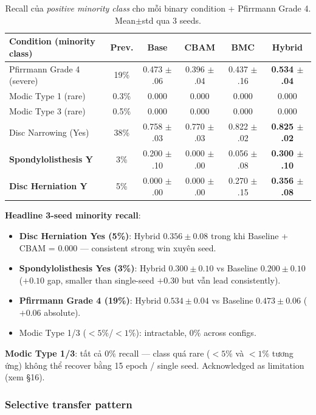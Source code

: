 \documentclass[11pt,a4paper]{article}
\newcommand{\best}[1]{\textcolor{best}{\textbf{#1}}}
\begin{document}
\begin{table}[h]
\centering
\caption{Recall của \emph{positive minority class} cho mỗi binary
condition + Pfirrmann Grade 4. Mean$\pm$std qua 3 seeds.}
\label{tab:spider_minority_recall}
\small
\begin{tabular}{@{}lccccc@{}}
\toprule
\rowcolor{tablehdr}
Condition (minority class) & Prev. & Base & CBAM & BMC & Hybrid \\
\midrule
Pfirrmann Grade 4 (severe)   & 19\%  & 0.473 $\pm$ .06 & 0.396 $\pm$ .04 & 0.437 $\pm$ .16 & \best{0.534 $\pm$ .04} \\
Modic Type 1 (rare)          & 0.3\% & 0.000 & 0.000 & 0.000 & 0.000 \\
Modic Type 3 (rare)          & 0.5\% & 0.000 & 0.000 & 0.000 & 0.000 \\
Disc Narrowing (Yes)         & 38\%  & 0.758 $\pm$ .03 & 0.770 $\pm$ .03 & 0.822 $\pm$ .02 & \best{0.825 $\pm$ .02} \\
\textbf{Spondylolisthesis Y} & 3\%   & 0.200 $\pm$ .10 & 0.000 $\pm$ .00 & 0.056 $\pm$ .08 & \best{0.300 $\pm$ .10} \\
\textbf{Disc Herniation Y}   & 5\%   & 0.000 $\pm$ .00 & 0.000 $\pm$ .00 & 0.270 $\pm$ .15 & \best{0.356 $\pm$ .08} \\
\bottomrule
\end{tabular}
\end{table}

\noindent\textbf{Headline 3-seed minority recall}:
\begin{itemize}[leftmargin=*]
\item \textbf{Disc Herniation Yes (5\%)}: Hybrid $0.356 \pm 0.08$
trong khi Baseline + CBAM = $0.000$ --- consistent strong win xuyên seed.
\item \textbf{Spondylolisthesis Yes (3\%)}: Hybrid $0.300 \pm 0.10$
vs Baseline $0.200 \pm 0.10$ ($+0.10$ gap, smaller than single-seed
$+0.30$ but vẫn lead consistently).
\item \textbf{Pfirrmann Grade 4 (19\%)}: Hybrid $0.534 \pm 0.04$ vs
Baseline $0.473 \pm 0.06$ ($+0.06$ absolute).
\item Modic Type 1/3 ($<5\%$/$<1\%$): intractable, $0\%$ across configs.
\end{itemize}

\noindent\textbf{Modic Type 1/3}: tất cả $0\%$ recall --- class quá
rare ($<5\%$ và $<1\%$ tương ứng) không thể recover bằng 15 epoch /
single seed. Acknowledged as limitation (xem §16).

\subsubsection*{Selective transfer pattern}
\end{document}
